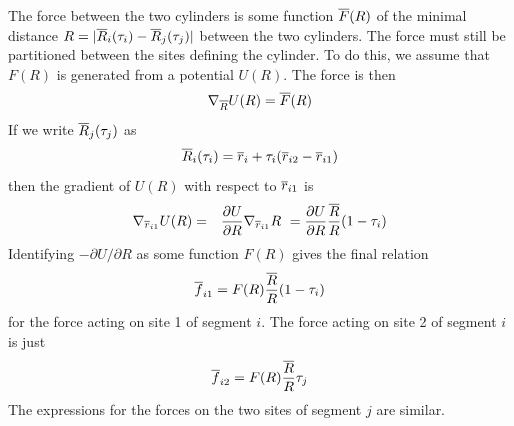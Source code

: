 \documentclass[12pt]{article}
\begin{document}
The force between the two cylinders is some function $\overline{F}(R)$ of the minimal
distance $R=|\overline{R}_i(\tau_i)-\overline{R}_j(\tau_j)|$ between the two cylinders. The
force must still be partitioned between the sites defining the cylinder. To do
this, we assume that $F(R)$ is generated from a potential $U(R)$. The force is
then
\[
\nabla_{\overline{R}}U(R) = \overline{F}(R)
\]
If we write $\overline{R}_j(\tau_j)$ as
\[
\overline{R}_i(\tau_i) = \overline{r}_i + \tau_i (\overline{r}_{i2}-\overline{r}_{i1})
\]
then the gradient of $U(R)$ with respect to $\overline{r}_{i1}$ is
\begin{eqnarray*}
\nabla_{\overline{r}_{i1}}U(R) & = & \frac{\partial U}{\partial R}\nabla_{\overline{r}_{i1}}R\
 = \frac{\partial U}{\partial R}\frac{\overline{R}}{R} (1-\tau_i)
\end{eqnarray*}
Identifying $-\partial U/\partial R$ as some function $F(R)$ gives the final
relation
\[
\overline{f}_{i1} = F(R)\frac{\overline{R}}{R}(1-\tau_i)
\]
for the force acting on site 1 of segment $i$. The force acting on site 2 of segment
$i$ is just
\[
\overline{f}_{i2} = F(R)\frac{\overline{R}}{R}\tau_j
\]
The expressions for the forces on the two sites of segment $j$ are similar.


\end{document}
